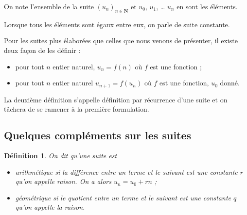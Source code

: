 \documentclass[12pt,a4paper]{article}
\newcommand{\N}{\mathbf{N}}
\theoremstyle{break}
\newtheorem{definition}{Définition}
\theoremstyle{plain}
\theoremstyle{nonumberplain}
\theoremstyle{nonumberbreak}
\begin{document}
On note l'ensemble de la suite $(u_n)_{n\in\N}$ et $u_0$, $u_1$, \dots
$u_n$ en sont les éléments.

Lorsque tous les éléments sont égaux entre eux, on parle de suite
constante.

Pour les suites plus élaborées que celles que nous venons de présenter,
il existe deux façon de les définir :
\begin{itemize}
  \item pour tout $n$ entier naturel, $u_n = f(n)$ où $f$ est une
    fonction ;
  \item pour tout $n$ entier naturel $u_{n+1} = f(u_n)$ où $f$ est une
    fonction, $u_0$ donné.
\end{itemize}
La deuxième définition s'appelle définition par récurrence d'une suite
et on tâchera de se ramener à la première formulation.


\subsection{Quelques compléments sur les suites}

\begin{definition}
  On dit qu'une suite est 
  \begin{itemize}
    \item arithmétique si la différence entre un terme et le suivant est
      une constante $r$ qu'on appelle raison. On a alors $u_n = u_0 +
      rn$ ;
    \item géométrique si le quotient entre un terme et le suivant est
      une constante $q$ qu'on appelle la raison.
  \end{itemize}
\end{definition}

\end{document}

